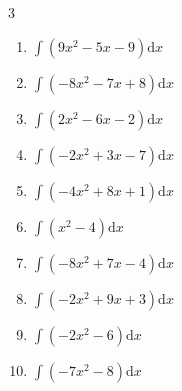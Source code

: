 \begin{multicols}{3}
\begin{enumerate}
  \item $\displaystyle \int \left( 9x^{2}-5x-9 \right) \mathrm{d}x$


\columnbreak %

  \item $\displaystyle \int \left( -8x^{2}-7x+8 \right) \mathrm{d}x$


  \item $\displaystyle \int \left( 2x^{2}-6x-2 \right) \mathrm{d}x$


  \item $\displaystyle \int \left( -2x^{2}+3x-7 \right) \mathrm{d}x$


  \item $\displaystyle \int \left( -4x^{2}+8x+1 \right) \mathrm{d}x$


  \item $\displaystyle \int \left( x^{2}-4 \right) \mathrm{d}x$


  \item $\displaystyle \int \left( -8x^{2}+7x-4 \right) \mathrm{d}x$


  \item $\displaystyle \int \left( -2x^{2}+9x+3 \right) \mathrm{d}x$


  \item $\displaystyle \int \left( -2x^{2}-6 \right) \mathrm{d}x$


  \item $\displaystyle \int \left( -7x^{2}-8 \right) \mathrm{d}x$



\end{enumerate}
\end{multicols}
